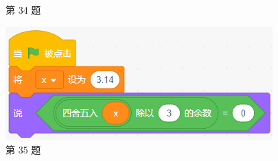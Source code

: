 \documentclass[10pt, a4paper]{article}
\begin{document}
\begin{figure}[htbp]
\begin{minipage}[t]{.3\textwidth}
            \caption*{第 34 题}
        \end{minipage}
        \begin{minipage}[t]{.3\textwidth}
            \centering
            \includegraphics[width=\textwidth]{figure/35.png}
            \caption*{第 35 题}
        \end{minipage}
    \end{figure}

        
        
\end{document}

